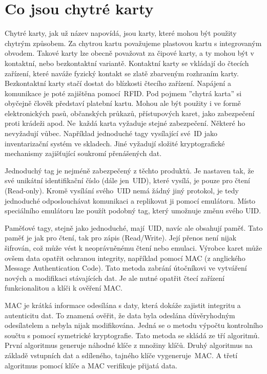 \section{Co jsou chytré karty}
Chytré karty, jak už název napovídá, jsou karty, které mohou být použity chytrým způsobem. Za chytrou kartu považujeme plastovou kartu s integrovaným obvodem. Takové karty lze obecně považovat za čipové karty, a ty mohou být v kontaktní, nebo bezkontaktní variantě. Kontaktní karty se vkládají do čtecích zařízení, které naváže fyzický kontakt se zlatě zbarveným rozhraním karty. Bezkontaktní karty stačí dostat do blízkosti čtecího zařízení. Napájení a komunikace je poté zajištěna pomocí~RFID. Pod pojmem ''chytrá karta'' si obyčejně člověk představí platební kartu. Mohou ale být použity i ve formě elektronických pasů, občanských průkazů, přístupových karet, jako zabezpečení proti krádeži apod. Ne~každá karta vyžaduje stejné zabezpečení. Některé ho nevyžadují vůbec. Například jednoduché tagy vysílající své~ID jako inventarizační systém ve skladech. Jiné vyžadují složité  kryptografické mechanismy zajišťující soukromí přenášených dat. 
\par
Jednoduchý tag je nejméně zabezpečený z těchto produktů. Je nastaven tak, že své unikátní identifikační číslo (dále jen~UID), které vysílá, je pouze pro čtení {(Read-only)}. Kromě vysílání svého~UID nemá žádný jiný protokol, je tedy jednoduché odposlouchávat komunikaci a replikovat ji pomocí emulátoru. Místo speciálního emulátoru lze použít podobný tag, který umožnuje změnu svého UID.
\par
Paměťové tagy, stejně jako jednoduché, mají~UID, navíc ale obsahují paměť. Tato paměť je jak pro čtení, tak pro zápis {(Read/Write)}. Její přenos není nijak šifrován, což může vést k neoprávněnému čtení nebo emulaci. Výrobce karet může ovšem data opatřit ochranou integrity, například pomocí MAC (z anglického Message Authentication Code). Tato metoda zabrání útočníkovi ve vytváření nových a modifikaci stávajících dat. Je ale nutné opatřit čtecí zařízení funkcionalitou a klíči k ověření MAC\cite{Mifare_Classic_story}.
\par
MAC je krátká informace odesílána s daty, která dokáže zajistit integritu a autenticitu dat. To znamená ověřit, že data byla odeslána důvěryhodným odesílatelem a nebyla nijak modifikována. Jedná se o metodu výpočtu kontrolního součtu s pomocí symetrické kryptografie. Tato metoda se skládá ze tří algoritmů. První algoritmus generuje náhodné klíče z množiny klíčů. Druhý algoritmus na základě vstupních dat a sdíleného, tajného klíče vygeneruje~MAC. A třetí algoritmus pomocí klíče a MAC verifikuje přijatá data\cite{Foundations_Of_Cryptography}.
